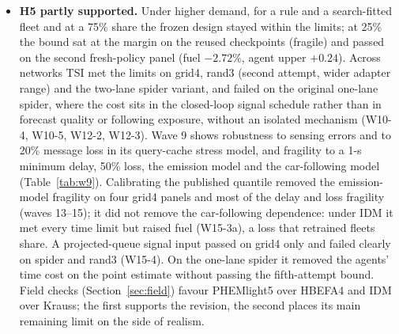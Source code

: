 \begin{itemize}
lowered fuel and agents' time loss against the wave-13 rule (W15-2); refitting the network on its own published logs added fuel but missed the
time margin at the third-attempt level. Against the corrected task-specific DC-Ada port at matched light-side simulation budget TSI has lower time losses but no
resolved fuel difference; that port fails the time limits, also when given TSI's speed information, the full horizon and up to eight times the budget. The
task-specific FoRL port, which retrains the signal, fails the limits, also with the authors' reward scale.
\item \textbf{H5 partly supported.} Under higher demand, for a rule and a search-fitted fleet and at a 75\% share the frozen design stayed
within the limits; at 25\% the bound sat at the margin on the reused checkpoints (fragile) and passed on the second fresh-policy panel
(fuel $-2.72\%$, agent upper $+0.24$). Across networks TSI met the limits on grid4, rand3 (second attempt, wider adapter range) and the
two-lane spider variant, and failed on the original one-lane spider, where the cost sits in the closed-loop signal schedule rather than in forecast quality or following exposure, without an isolated
mechanism (W10-4, W10-5, W12-2, W12-3). Wave 9 shows
robustness to sensing errors and to 20\% message loss in its query-cache stress model, and fragility to a 1-s minimum delay, 50\% loss,
the emission model and the car-following model (Table~\ref{tab:w9}). Calibrating the published quantile removed the emission-model
fragility on four grid4 panels and most of the delay and loss fragility (waves 13--15); it did not remove the car-following dependence:
under IDM it met every time limit but raised fuel (W15-3a), a loss that retrained fleets share. A projected-queue signal input passed on
grid4 only and failed clearly on spider and rand3 (W15-4). On the one-lane spider it removed the agents' time cost on the point estimate without passing the
fifth-attempt bound. Field checks (Section~\ref{sec:field}) favour PHEMlight5 over HBEFA4 and IDM over Krauss; the first supports the revision,
the second places its main remaining limit on the side of realism.
\end{itemize}

